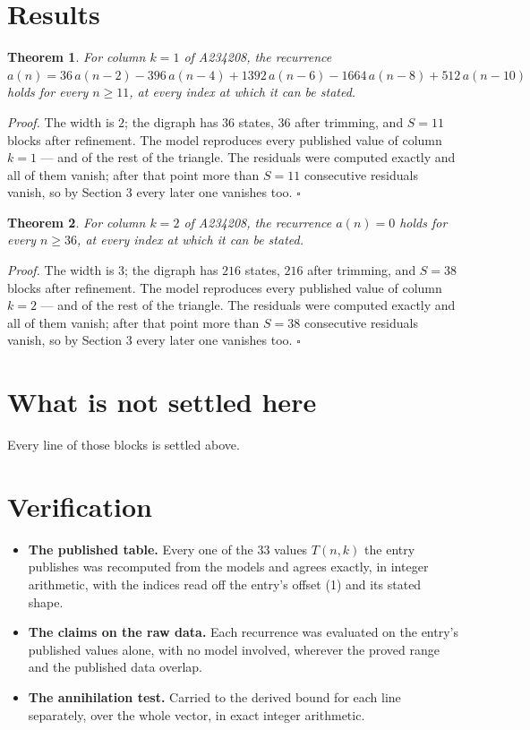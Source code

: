 \documentclass[11pt]{article}
\newtheorem{theorem}{Theorem}
\theoremstyle{definition}
\begin{document}
\section{Results}

\begin{theorem} For column $k = 1$ of A234208, the recurrence $a(n) = 36\,a(n-2) - 396\,a(n-4) + 1392\,a(n-6) - 1664\,a(n-8) + 512\,a(n-10)$ holds for every $n \ge 11$, at every index at which it can be stated.\end{theorem}

{\itshape Proof.} The width is $2$; the digraph has $36$ states, $36$ after trimming, and $S = 11$ blocks after refinement. The model reproduces every published value of column $k = 1$ --- and of the rest of the triangle. The residuals were computed exactly and all of them vanish; after that point more than $S = 11$ consecutive residuals vanish, so by Section 3 every later one vanishes too. $\square$

\begin{theorem} For column $k = 2$ of A234208, the recurrence $a(n) = 0$ holds for every $n \ge 36$, at every index at which it can be stated.\end{theorem}

{\itshape Proof.} The width is $3$; the digraph has $216$ states, $216$ after trimming, and $S = 38$ blocks after refinement. The model reproduces every published value of column $k = 2$ --- and of the rest of the triangle. The residuals were computed exactly and all of them vanish; after that point more than $S = 38$ consecutive residuals vanish, so by Section 3 every later one vanishes too. $\square$

\section{What is not settled here}

Every line of those blocks is settled above.

\section{Verification}

\begin{itemize}

\item {\bfseries The published table.} Every one of the 33 values $T(n,k)$ the entry publishes was recomputed from the models and agrees exactly, in integer arithmetic, with the indices read off the entry's offset (1) and its stated shape.

\item {\bfseries The claims on the raw data.} Each recurrence was evaluated on the entry's published values alone, with no model involved, wherever the proved range and the published data overlap.

\item {\bfseries The annihilation test.} Carried to the derived bound for each line separately, over the whole vector, in exact integer arithmetic.

\end{itemize}
\end{document}
